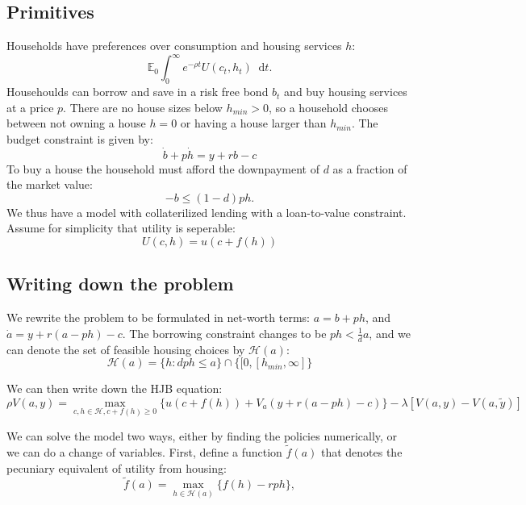 \documentclass[12pt]{article}
\newcommand{\E}{\mathbb{E}}
\DeclareMathOperator{\1}{\mathbbm{1}}
\newcommand*\diff{\mathop{}\!\mathrm{d}}
\begin{document}
\subsection{Primitives}
Households have preferences over consumption and housing services $h$:
\begin{equation}
\E_0 \int_0^\infty e^{-\rho t} U(c_t,h_t)\diff t.
\end{equation}
Househoulds can borrow and save in a risk free bond $b_t$ and buy housing services at a price $p$. There are no house sizes below $h_{min}>0$, so a household chooses between not owning a house $h=0$ or having a house larger than $h_{min}$. The budget constraint is given by:
\begin{equation*}
\dot b + p \dot h = y +r b - c
\end{equation*}
To buy a house the household must afford the downpayment of $d$ as a fraction of the market value:
\begin{equation*}
-b \le (1-d)ph.
\end{equation*}
We thus have a model with collaterilized lending with a loan-to-value constraint. Assume for simplicity that utility is seperable:
\begin{equation}
U(c,h)=u(c + f(h))
\end{equation}

\subsection{Writing down the problem}
We rewrite the problem to be formulated in net-worth terms: $ a=b+ph $, and $\dot a = y + r(a - ph) -c$. The borrowing constraint changes to be $ph<\frac{1}{d} a$,  and we can denote the set of feasible housing choices by $\mathcal{H}(a)$:
\begin{equation*}
\mathcal{H}(a) = \{h: dph \le a  \} \cap \{[0,[h_{min},\infty] \}
\end{equation*}

We can then write down the HJB equation:
\begin{equation}
\rho V(a,y) = \max_{c,h\in \mathcal{H},c+f(h)\ge 0} \big \{ u (c + f(h)) + V_a (y + r(a-ph) - c)\big \} - \lambda [V(a,y) - V(a,\tilde y)] 
\end{equation}

We can solve the model two ways, either by finding the policies numerically, or we can do a change of variables. First, define a function $\tilde f(a)$ that denotes the pecuniary equivalent of utility from housing:
\begin{equation}
\tilde f (a) = \max_{h\in \mathcal{H}(a)} \big \{ f(h) - rph \},
\end{equation}
\end{document}
